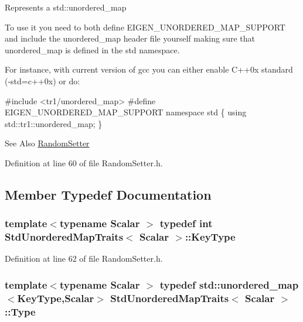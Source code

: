 Represents a std\-::unordered\-\_\-map

To use it you need to both define E\-I\-G\-E\-N\-\_\-\-U\-N\-O\-R\-D\-E\-R\-E\-D\-\_\-\-M\-A\-P\-\_\-\-S\-U\-P\-P\-O\-R\-T and include the unordered\-\_\-map header file yourself making sure that unordered\-\_\-map is defined in the std namespace.

For instance, with current version of gcc you can either enable C++0x standard (-\/std=c++0x) or do\-: 
\begin{DoxyCode}
\textcolor{preprocessor}{#include <tr1/unordered\_map>}
\textcolor{preprocessor}{#define EIGEN\_UNORDERED\_MAP\_SUPPORT}
\textcolor{preprocessor}{}\textcolor{keyword}{namespace }std \{
  \textcolor{keyword}{using} std::tr1::unordered\_map;
\}
\end{DoxyCode}


\begin{DoxySeeAlso}{See Also}
\hyperlink{class_random_setter}{Random\-Setter} 
\end{DoxySeeAlso}


Definition at line 60 of file Random\-Setter.\-h.



\subsection{Member Typedef Documentation}
\hypertarget{struct_std_unordered_map_traits_ab5becfe9c547220362d1c68a2133593f}{
\subsubsection[{Key\-Type}]{\setlength{\rightskip}{0pt plus 5cm}template$<$typename Scalar $>$ typedef {\bf int} {\bf Std\-Unordered\-Map\-Traits}$<$ Scalar $>$\-::{\bf Key\-Type}}}\label{struct_std_unordered_map_traits_ab5becfe9c547220362d1c68a2133593f}


Definition at line 62 of file Random\-Setter.\-h.

\hypertarget{struct_std_unordered_map_traits_a343105e32275b2bdcce2260bc8b327c7}{
\subsubsection[{Type}]{\setlength{\rightskip}{0pt plus 5cm}template$<$typename Scalar $>$ typedef std\-::unordered\-\_\-map$<${\bf Key\-Type},Scalar$>$ {\bf Std\-Unordered\-Map\-Traits}$<$ Scalar $>$\-::{\bf Type}}}\label{struct_std_unordered_map_traits_a343105e32275b2bdcce2260bc8b327c7}


